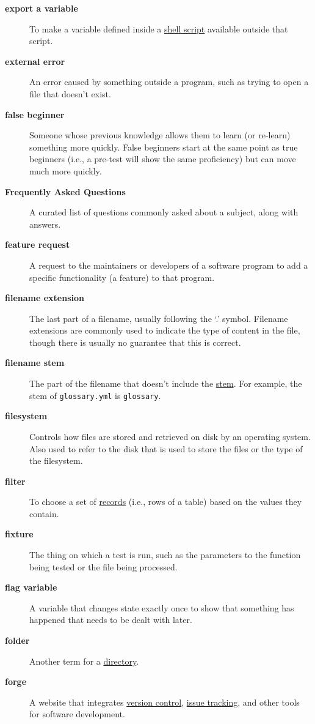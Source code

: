 \documentclass[
]{krantz}
\begin{document}
\begin{description}
\item[\textbf{export a variable}]
To make a variable defined inside a \protect\hyperlink{shell_script}{shell script} available outside that script.
\item[\textbf{external error}]
An error caused by something outside a program, such as trying to open a file that doesn't exist.
\item[\textbf{false beginner}]
Someone whose previous knowledge allows them to learn (or re-learn) something more quickly. False beginners start at the same point as true beginners (i.e., a pre-test will show the same proficiency) but can move much more quickly.
\item[\textbf{Frequently Asked Questions}]
A curated list of questions commonly asked about a subject, along with answers.
\item[\textbf{feature request}]
A request to the maintainers or developers of a software program to add a specific functionality (a feature) to that program.
\item[\textbf{filename extension}]
The last part of a filename, usually following the `.' symbol. Filename extensions are commonly used to indicate the type of content in the file, though there is usually no guarantee that this is correct.
\item[\textbf{filename stem}]
The part of the filename that doesn't include the \protect\hyperlink{filename_stem}{stem}. For example, the stem of \texttt{glossary.yml} is \texttt{glossary}.
\item[\textbf{filesystem}]
Controls how files are stored and retrieved on disk by an operating system. Also used to refer to the disk that is used to store the files or the type of the filesystem.
\item[\textbf{filter}]
To choose a set of \protect\hyperlink{record}{records} (i.e., rows of a table) based on the values they contain.
\item[\textbf{fixture}]
The thing on which a test is run, such as the parameters to the function being tested or the file being processed.
\item[\textbf{flag variable}]
A variable that changes state exactly once to show that something has happened that needs to be dealt with later.
\item[\textbf{folder}]
Another term for a \protect\hyperlink{directory}{directory}.
\item[\textbf{forge}]
A website that integrates \protect\hyperlink{version_control}{version control}, \protect\hyperlink{issue_tracking_system}{issue tracking}, and other tools for software development.

\end{description}
\end{document}
